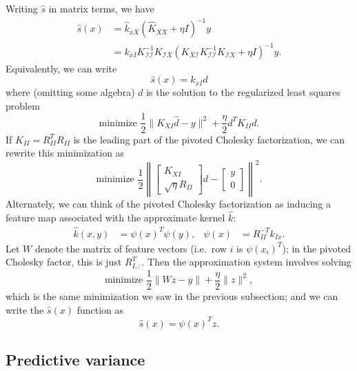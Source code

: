 \documentclass[12pt, leqno]{article} %
\newcommand{\calI}{\mathcal{I}}
\begin{document}
Writing $\hat{s}$ in matrix terms, we have
\begin{align*}
  \hat{s}(x)
  &= \hat{k}_{xX} (\hat{K}_{XX} + \eta I)^{-1} y \\
  &= k_{xI} K_{\calI \calI}^{-1} K_{\calI X}
     ( K_{X \calI} K_{\calI \calI}^{-1} K_{\calI X} + \eta I)^{-1} y.
\end{align*}
Equivalently, we can write
\[
  \hat{s}(x) = k_{xI} d
\]
where (omitting some algebra) $d$ is the solution to the regularized
least squares problem
\[
  \mbox{minimize }
  \frac{1}{2} \|K_{XI} \hat{d}-y\|^2 + \frac{\eta}{2} d^T K_{II} d.
\]
If $K_{II} = R_{II}^T R_{II}$ is the leading part of the pivoted
Cholesky factorization, we can rewrite this minimization as
\[
  \mbox{minimize }
  \frac{1}{2} \left\|
    \begin{bmatrix} K_{XI} \\ \sqrt{\eta} R_{II} \end{bmatrix} d -
    \begin{bmatrix} y \\ 0 \end{bmatrix}
  \right\|^2.
\]
Alternately, we can think of the pivoted Cholesky factorization as
inducing a feature map associated with the approximate kernel
$\hat{k}$:
\begin{align*}
  \hat{k}(x,y) &= \psi(x)^T \psi(y), &
  \psi(x) &= R_{II}^{-T} k_{Ix}.
\end{align*}
Let $W$ denote the matrix of feature vectors (i.e.~row $i$ is
$\psi(x_i)^T$); in the pivoted Cholesky factor, this is just
$R_{I,:}^T$.  Then the approximation system involves solving
\[
  \mbox{minimize }
  \frac{1}{2} \| W z - y \| + \frac{\eta}{2} \|z\|^2,
\]
which is the same minimization we saw in the previous subsection;
and we can write the $\hat{s}(x)$ function as
\[
  \hat{s}(x) = \psi(x)^T z.
\]

\subsection{Predictive variance}
\end{document}
